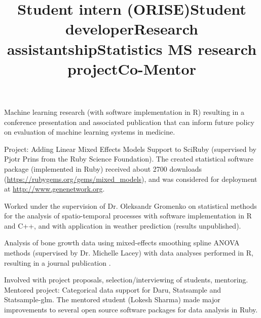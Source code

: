 \documentclass[overlapped, line, 10pt]{res} %
\begin{document}
\begin{resume}
\title{Student intern (ORISE)}
\begin{position}
  Machine learning research (with software implementation in R) resulting in a conference presentation and associated publication \cite{gossmann2018} that can inform future policy on evaluation of machine learning systems in medicine.
\end{position}

\title{Student developer}
\begin{position}
  Project: Adding Linear Mixed Effects Models Support to SciRuby (supervised by Pjotr Prins from the Ruby Science Foundation). The created statistical software package (implemented in Ruby) received about 2700 downloads (\url{https://rubygems.org/gems/mixed_models}), and was considered for deployment at \url{http://www.genenetwork.org}.
\end{position}

\title{Research assistantship}
\begin{position}
  Worked under the supervision of Dr. Oleksandr Gromenko on statistical methods for the analysis of spatio-temporal processes with software implementation in R and C++, and with application in weather prediction (results unpublished).
\end{position}

\title{Statistics MS research project}
\begin{position}
  Analysis of bone growth data using mixed-effects smoothing spline ANOVA methods (supervised by Dr. Michelle Lacey) with data analyses performed in R, resulting in a journal publication \cite{sammarco2015}.
\end{position}

\title{Co-Mentor}
\begin{position}
  Involved with project proposals, selection/interviewing of students, mentoring. Mentored project: Categorical data support for Daru, Statsample and Statsample-glm. The mentored student (Lokesh Sharma) made major improvements to several open source software packages for data analysis in Ruby.
\end{position}


\end{resume}
\end{document}
